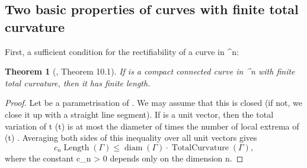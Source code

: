 \documentclass[a4paper, 11pt]{article}
\theoremstyle{plain}
\newtheorem{theorem}{Theorem}[section]
\theoremstyle{definition}
\theoremstyle{remark}
\numberwithin{equation}{subsection}
\def\({}
\def\){}
\def\pi{}
\begin{document}



\subsection{Two basic properties of curves with finite total curvature}

First, a sufficient condition for the rectifiability of a curve in \(^{n}\):

\begin{theorem}[{\cite{EWW02}, Theorem 10.1}]
\label{Basic_Property_1}
If \(\Gamma\) is a compact connected curve in \(^{n}\) with finite total curvature, then it has finite length.
\end{theorem}

  
\begin{proof}
Let \(\gamma\) be a parametrisation of \(\Gamma\). We may assume that this is closed (if not, we close it up with a straight line segment). If \(\) is a unit vector, then the total variation of \(t \mapsto \gamma(t) \cdot {}\) is at most the diameter of \(\Gamma\) times the number of local extrema of \(\gamma(t) \cdot {}\). Averaging both sides of this inequality over all unit vectors \(\) gives
\begin{equation}
c_{n}\operatorname{Length}(\Gamma) \leqslant \operatorname{diam}(\Gamma) \cdot \operatorname{TotalCurvature}(\Gamma),
\end{equation}
where the constant \(c_{n} > 0\) depends only on the dimension \(n\).
\end{proof}
\end{document}
